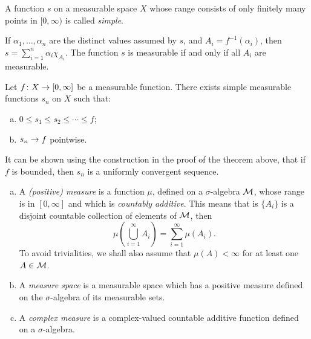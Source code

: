 \begin{definition}
  A function $s$ on a measurable space $X$ whose range consists of only finitely many points in $[0,\infty)$ is called \emph{simple}.
\end{definition}
If $\alpha_1, \dots, \alpha_n$ are the distinct values assumed by $s$, and $A_i = f^{-1}(\alpha_i)$, then $s = \sum_{i=1}^n \alpha_i \chi_{A_i}$. The function $s$ is measurable if and only if all $A_i$ are measurable.

\begin{theorem}
  Let $f \colon X \rightarrow [0,\infty]$ be a measurable function. There exists simple measurable functions $s_n$ on $X$ such that:
  \begin{enumerate}[(a)]
  \item $0 \leq s_1 \leq s_2 \leq \cdots \leq f$;
  \item $s_n \rightarrow f$ pointwise.
  \end{enumerate}
\end{theorem}

\begin{remark}
  It can be shown using the construction in the proof of the theorem above, that if $f$ is bounded, then $s_n$ is a uniformly convergent sequence.
\end{remark}

\begin{definition}
  \mbox{}
  \begin{enumerate}[(a)]
  \item A \emph{(positive) measure} is a function $\mu$, defined on a $\sigma$-algebra $\mathcal{M}$, whose range is in $[0,\infty]$ and which is \emph{countably additive}. This means that is $\{A_i\}$ is a disjoint countable collection of elements of $\mathcal{M}$, then
    \[
    \mu\left( \bigcup_{i=1}^\infty A_i \right) = \sum_{i=1}^\infty \mu(A_i).
    \]
    To avoid trivialities, we shall also assume that $\mu(A) < \infty$ for at least one $A \in \mathcal{M}$.
  \item A \emph{measure space} is a measurable space which has a positive measure defined on the $\sigma$-algebra of its measurable sets.
  \item A \emph{complex measure} is a complex-valued countable additive function defined on a $\sigma$-algebra.
  \end{enumerate}
\end{definition}

